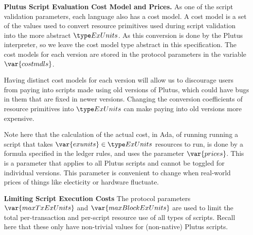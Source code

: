 \textbf{Plutus Script Evaluation Cost Model and Prices.}
As one of the script validation parameters, each language also has a
cost model. A cost model is a set of the values used to convert resource
primitives used during script validation into the
more abstract $\ExUnits$. As this conversion is done by the Plutus interpreter,
so we leave the cost model type abstract in this specification.
The cost models for each version are stored in the protocol
parameters in the variable $\var{costmdls}$.

Having distinct cost models for each version will allow us to discourage users from
paying into scripts made using old versions of Plutus, which could have bugs
in them that are fixed in newer versions. Changing the conversion coefficients
of resource primitives into $\ExUnits$ can make paying into old versions
more expensive.

Note here that the calculation of the actual cost, in Ada, of running
running a script that takes $\var{exunits} \in \ExUnits$ resources to run,
is done by a formula specified in the ledger rules, and uses the parameter
$\var{prices}$. This is a parameter that applies to all Plutus
scripts and cannot be toggled for individual versions. This parameter is
convenient to change when real-world prices of things like electicity or hardware
fluctuate.

\textbf{Limiting Script Execution Costs}
The protocol parameters $\var{maxTxExUnits}$ and $\var{maxBlockExUnits}$ are
used to limit the total per-transaction and per-script resource use of all
types of scripts. Recall here that these only have non-trivial values for
(non-native) Plutus scripts.

